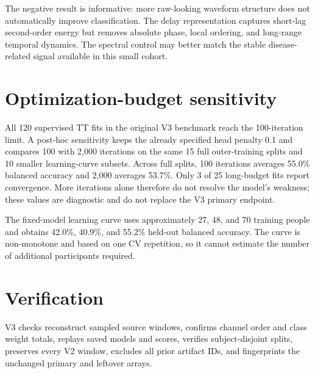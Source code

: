 The negative result is informative: more raw-looking waveform structure does
not automatically improve classification. The delay representation captures
short-lag second-order energy but removes absolute phase, local ordering, and
long-range temporal dynamics. The spectral control may better match the stable
disease-related signal available in this small cohort.

\section{Optimization-budget sensitivity}

All 120 supervised TT fits in the original V3 benchmark reach the 100-iteration
limit. A post-hoc sensitivity keeps the already specified head penalty 0.1 and
compares 100 with 2,000 iterations on the same 15 full outer-training splits and
10 smaller learning-curve subsets. Across full splits, 100 iterations averages
55.0\% balanced accuracy and 2,000 averages 53.7\%. Only 3 of 25 long-budget
fits report convergence. More iterations alone therefore do not resolve the
model's weakness; these values are diagnostic and do not replace the V3 primary
endpoint.

The fixed-model learning curve uses approximately 27, 48, and 70 training people
and obtains 42.0\%, 40.9\%, and 55.2\% held-out balanced accuracy. The curve is
non-monotone and based on one CV repetition, so it cannot estimate the number of
additional participants required.

\section{Verification}

V3 checks reconstruct sampled source windows, confirms channel order and class
weight totals, replays saved models and scores, verifies subject-disjoint splits,
preserves every V2 window, excludes all prior artifact IDs, and fingerprints the
unchanged primary and leftover arrays.

